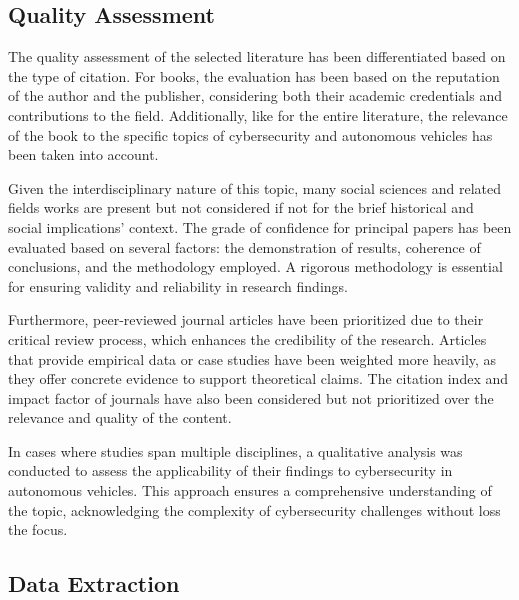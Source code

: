 \subsection{Quality Assessment}\label{subsec:quality-assessment}
The quality assessment of the selected literature has been differentiated based on the type of citation.
For books, the evaluation has been based on the reputation of the author and the publisher, considering both their academic credentials and contributions to the field.
Additionally, like for the entire literature, the relevance of the book to the specific topics of cybersecurity and autonomous vehicles has been taken into account.

Given the interdisciplinary nature of this topic, many social sciences and related fields works are present but not considered if not for the brief historical and social implications' context.
The grade of confidence for principal papers has been evaluated based on several factors:
the demonstration of results, coherence of conclusions, and the methodology employed.
A rigorous methodology is essential for ensuring validity and reliability in research findings.

Furthermore, peer-reviewed journal articles have been prioritized due to their critical review process, which enhances the credibility of the research.
Articles that provide empirical data or case studies have been weighted more heavily, as they offer concrete evidence to support theoretical claims.
The citation index and impact factor of journals have also been considered but not prioritized over the relevance and quality of the content.

In cases where studies span multiple disciplines, a qualitative analysis was conducted to assess the applicability of their findings to cybersecurity in autonomous vehicles.
This approach ensures a comprehensive understanding of the topic, acknowledging the complexity of cybersecurity challenges without loss the focus.

\subsection{Data Extraction}\label{subsec:data-extraction}

